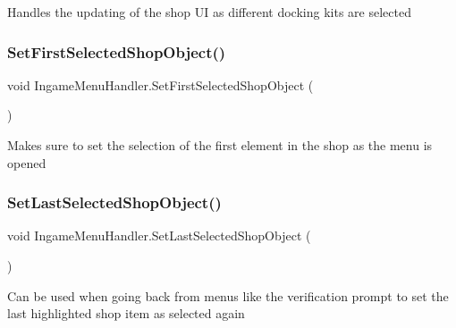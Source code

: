 Handles the updating of the shop UI as different docking kits are selected 

\hypertarget{class_ingame_menu_handler_af52e74182c996325dea46ef3ff1ae411}{}\label{class_ingame_menu_handler_af52e74182c996325dea46ef3ff1ae411} 
\subsubsection{\texorpdfstring{Set\+First\+Selected\+Shop\+Object()}{SetFirstSelectedShopObject()}}
{\footnotesize\ttfamily void Ingame\+Menu\+Handler.\+Set\+First\+Selected\+Shop\+Object (\begin{DoxyParamCaption}{ }\end{DoxyParamCaption})}



Makes sure to set the selection of the first element in the shop as the menu is opened 

\hypertarget{class_ingame_menu_handler_a3568838c7f2c58aaf31e1522e81f2019}{}\label{class_ingame_menu_handler_a3568838c7f2c58aaf31e1522e81f2019} 
\subsubsection{\texorpdfstring{Set\+Last\+Selected\+Shop\+Object()}{SetLastSelectedShopObject()}}
{\footnotesize\ttfamily void Ingame\+Menu\+Handler.\+Set\+Last\+Selected\+Shop\+Object (\begin{DoxyParamCaption}{ }\end{DoxyParamCaption})}



Can be used when going back from menus like the verification prompt to set the last highlighted shop item as selected again 

\hypertarget{class_ingame_menu_handler_a887353360c22365c0114e93963cc5062}{}\label{class_ingame_menu_handler_a887353360c22365c0114e93963cc5062} 
